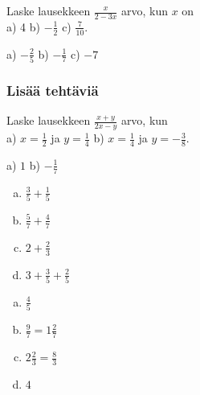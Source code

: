 \begin{tehtavasivu}
\begin{tehtava}
Laske lausekkeen $\frac{x}{2-3x}$ arvo, kun $x$ on \\ a) 4 \qquad b) $-\frac{1}{2}$ \qquad c) $\frac{7}{10}$.
\begin{vastaus}
a) $-\frac{2}{5}$ \qquad b) $-\frac{1}{7}$ \qquad c) $-7$
\end{vastaus}
\end{tehtava}


\subsubsection*{Lisää tehtäviä}

\begin{tehtava}
Laske lausekkeen $\frac{x+y}{2x-y}$ arvo, kun \\ a) $x=\frac{1}{2}$ ja $y= \frac{1}{4}$ \qquad b) $x=\frac{1}{4}$ ja $y= -\frac{3}{8}$.
\begin{vastaus}
a) $1$ \qquad b) $-\frac{1}{7}$
\end{vastaus}
\end{tehtava}


 
    
        \begin{tehtava}
            \begin{enumerate}[a)]
        	\item $\frac{3}{5} + \frac{1}{5}$
        	\item $\frac{5}{7} + \frac{4}{7}$
        	\item $2 + \frac{2}{3}$
        	\item$3 + \frac{3}{5} + \frac{2}{5}$   
            \end{enumerate}
            \begin{vastaus}
        		\begin{enumerate}[(a)]
        			\item $\frac{4}{5}$
        			\item $\frac{9}{7} = 1 \frac{2}{7}$
        			\item $2 \frac{2}{3} = \frac{8}{3}$
        			\item $4$
        		\end{enumerate}
            \end{vastaus}
        \end{tehtava}
        

\end{tehtavasivu}
